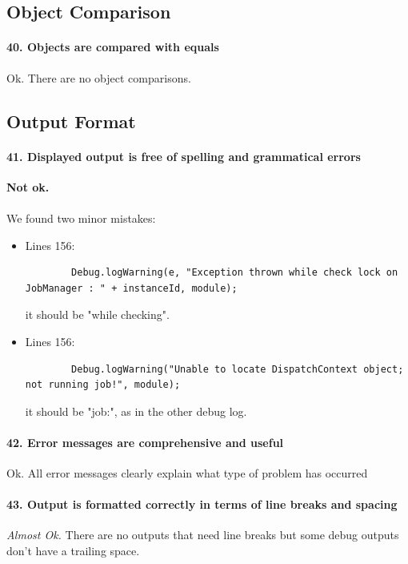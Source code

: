 \documentclass[english]{article}
\begin{document}
\subsection{Object Comparison}
\paragraph{40. Objects are compared with equals}
Ok.
There are no object comparisons.

\newpage
\subsection{Output Format}
\paragraph{41. Displayed output is free of spelling and grammatical errors}
\textcolor{cornellred}{\textbf{Not ok.}}
\paragraph{}
We found two minor mistakes:

\begin{itemize}
	\item{Lines 156: 
	\begin{lstlisting}
		Debug.logWarning(e, "Exception thrown while check lock on JobManager : " + instanceId, module);
	\end{lstlisting}
	it should be "while checking".}
	\item{Lines 156: 
	\begin{lstlisting}
		Debug.logWarning("Unable to locate DispatchContext object; not running job!", module);
	\end{lstlisting}
	it should be "job:", as in the other debug log.}
\end{itemize}


\paragraph{42. Error messages are comprehensive and useful}
Ok. All error messages clearly explain what type of problem has occurred

\paragraph{43. Output is formatted correctly in terms of line breaks and spacing} \textit{Almost Ok.}
There are no outputs that need line breaks but some debug outputs don't have a trailing space.
\end{document}
